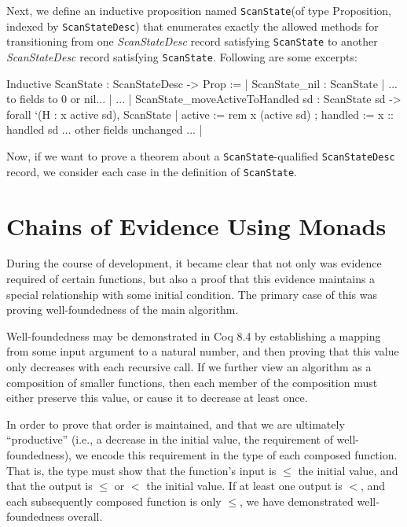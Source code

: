\documentclass{llncs}
\newenvironment{MyCoqUneval}{\small \verbatim}{\endverbatim \normalsize}
\begin{document}
Next, we define an inductive proposition named \texttt{ScanState}(of type
Proposition, indexed by \texttt{ScanStateDesc}) that enumerates exactly the
allowed methods for transitioning from one \emph{ScanStateDesc} record
satisfying \texttt{ScanState} to another \emph{ScanStateDesc} record
satisfying \texttt{ScanState}. Following are some excerpts:

\begin{MyCoqUneval}
Inductive ScanState : ScanStateDesc -> Prop :=
  | ScanState_nil :
    ScanState
      {| ... to fields to 0 or nil... |}
...
  | ScanState_moveActiveToHandled sd :
    ScanState sd -> forall `(H : x \in active sd),
    ScanState
      {| active           := rem x (active sd)
       ; handled          := x :: handled sd
         ... other fields unchanged ... |}
\end{MyCoqUneval}
     
Now, if we want to prove a theorem about a \texttt{ScanState}-qualified
\texttt{ScanStateDesc} record, we consider each case in the definition of
\texttt{ScanState}.

\section{Chains of Evidence Using Monads}
\label{sec:pfmorph}

During the course of development, it became clear that not only was evidence
required of certain functions, but also a proof that this evidence maintains a
special relationship with some initial condition.  The primary case of this
was proving well-foundedness of the main algorithm.

Well-foundedness may be demonstrated in Coq 8.4 by establishing a mapping from
some input argument to a natural number, and then proving that this value only
decreases with each recursive call.  If we further view an algorithm as a
composition of smaller functions, then each member of the composition must
either preserve this value, or cause it to decrease at least once.

In order to prove that order is maintained, and that we are ultimately
``productive'' (i.e., a decrease in the initial value, the requirement of
well-foundedness), we encode this requirement in the type of each composed
function.  That is, the type must show that the function's input is $\le$ the
initial value, and that the output is $\le$ or $<$ the initial value.  If at
least one output is $<$, and each subsequently composed function is only
$\le$, we have demonstrated well-foundedness overall.
\end{document}
